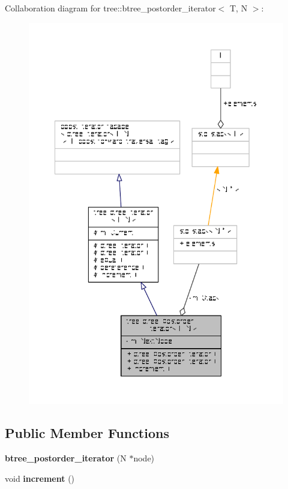 Collaboration diagram for tree\-:\-:btree\-\_\-postorder\-\_\-iterator$<$ T, N $>$\-:
\nopagebreak
\begin{figure}[H]
\begin{center}
\leavevmode
\includegraphics[width=350pt]{classtree_1_1btree__postorder__iterator__coll__graph}
\end{center}
\end{figure}
\subsection*{Public Member Functions}
\begin{DoxyCompactItemize}
\item 
\hypertarget{classtree_1_1btree__postorder__iterator_a9dec1c88cc657e81f3579058beda85b1}{{\bfseries btree\-\_\-postorder\-\_\-iterator} (N $\ast$node)}\label{classtree_1_1btree__postorder__iterator_a9dec1c88cc657e81f3579058beda85b1}

\item 
\hypertarget{classtree_1_1btree__postorder__iterator_ab4fb98322432ec53accacd76d17d520e}{void {\bfseries increment} ()}\label{classtree_1_1btree__postorder__iterator_ab4fb98322432ec53accacd76d17d520e}

\end{DoxyCompactItemize}
